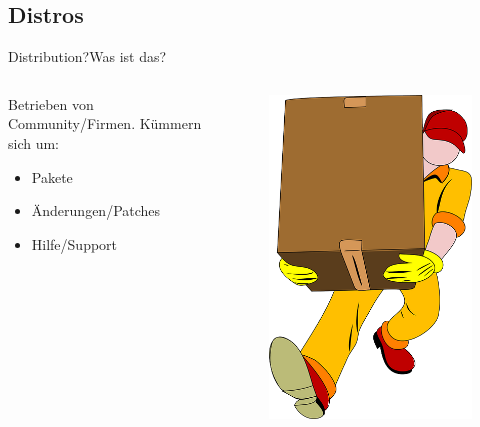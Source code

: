 

\subsection{Distros}
\begin{frame}{Distribution?}{Was ist das?}
\begin{columns}
\begin{column}{0.6\textwidth}
Betrieben von Community/Firmen.
Kümmern sich um: 
\begin{itemize}
 \item Pakete
 \item Änderungen/Patches
 \item Hilfe/Support
\end{itemize}
 
 \end{column}
\begin{column}{0.4\textwidth}
 \begin{figure}
 \includegraphics[height=0.5\textheight]{resources/movers-24402_640.png}
 \end{figure}
\end{column}
\end{columns}
 \end{frame}

